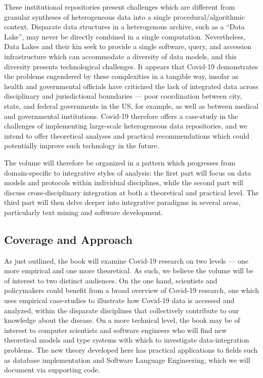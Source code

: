 \documentclass{statsoc}
\newcommand{\p}[1]{

\vspace{.75em}#1}
\newcommand{\q}[1]{{\fontfamily{qcr}\selectfont ``}#1{\fontfamily{qcr}\selectfont ''}}
\begin{document}
{\p{These institutional repositories present 
challenges which are different from granular 
syntheses of heterogeneous data into a single 
procedural/algorithmic context.  Disparate data structures 
in a heterogenous archive, such as a \q{Data Lake}, may 
never be directly combined in a single computation.  
Nevertheless, Data Lakes and their kin seek to 
provide a single software, query, and accession infrastructure 
which can accommodate a diversity of data models, and 
this diversity presents technological challenges.  
It appears that Covid-19 demonstrates the problems 
engendered by these complexities in a tangible way, 
insofar as health and governmental officials have criticized 
the lack of integrated data across disciplinary and 
jurisdictional boundaries --- poor coordination between 
city, state, and federal governments in the US, for 
example, as well as between medical and governmental institutions.  
Covid-19 therefore offers a case-study in the challenges 
of implementing large-scale heterogeneous data repositories, 
and we intend to offer theoretical analyses and practical 
recommendations which could potentially improve such 
technology in the future.} 

\p{The volume will therefore be organized in a pattern 
which progresses from domain-specific to integrative 
styles of analysis: the first part will focus on data 
models and protocols within individual disciplines, 
while the second part will discuss 
cross-disciplinary integration at both a theoretical and 
practical level.  The third part will then delve deeper 
into integrative paradigms in several areas, particularly 
text mining and software development.}  

\subsection{Coverage and Approach}

\p{As just outlined, the book will examine 
Covid-19 research on two levels --- one more 
empirical and one more theoretical.  As such, 
we believe the volume will be of interest 
to two distinct audiences.  On the one hand, 
scientists and policymakers could benefit 
from a broad overview of Covid-19 research, 
one which uses empirical case-studies to 
illustrate how Covid-19 data is accessed and 
analyzed, within the disparate disciplines that 
collectively contribute to our knowledge 
about the disease.  On a more technical 
level, the book may be of interest to 
computer scientists and software engineers 
who will find new theoretical models and 
type systems with which to investigate 
data-integration problems.  The new 
theory developed here has practical applications 
to fields such as database implementation and 
Software Language Engineering, which we will 
document via supporting code.}

}
\end{document}
